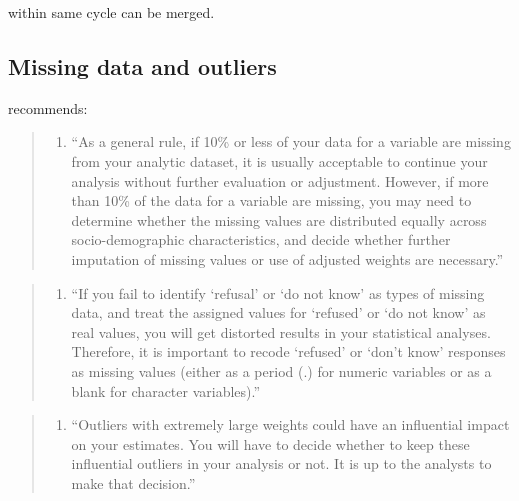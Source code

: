 \documentclass[
]{book}
\providecommand{\tightlist}{%
  \setlength{\itemsep}{0pt}\setlength{\parskip}{0pt}}
\begin{document}
within same cycle can be merged.

\hypertarget{missing-data-and-outliers}{%
\subsection{Missing data and outliers}\label{missing-data-and-outliers}}

\citet{CDCfaq} recommends:

\begin{quote}
\begin{enumerate}
\def\labelenumi{\arabic{enumi}.}
\tightlist
\item
  ``As a general rule, if 10\% or less of your data for a variable are missing from your analytic dataset, it is usually acceptable to continue your analysis without further evaluation or adjustment. However, if more than 10\% of the data for a variable are missing, you may need to determine whether the missing values are distributed equally across socio-demographic characteristics, and decide whether further imputation of missing values or use of adjusted weights are necessary.''
\end{enumerate}
\end{quote}

\begin{quote}
\begin{enumerate}
\def\labelenumi{\arabic{enumi}.}
\setcounter{enumi}{1}
\tightlist
\item
  ``If you fail to identify `refusal' or `do not know' as types of missing data, and treat the assigned values for `refused' or `do not know' as real values, you will get distorted results in your statistical analyses. Therefore, it is important to recode `refused' or `don't know' responses as missing values (either as a period (.) for numeric variables or as a blank for character variables).''
\end{enumerate}
\end{quote}

\begin{quote}
\begin{enumerate}
\def\labelenumi{\arabic{enumi}.}
\setcounter{enumi}{2}
\tightlist
\item
  ``Outliers with extremely large weights could have an influential impact on your estimates. You will have to decide whether to keep these influential outliers in your analysis or not. It is up to the analysts to make that decision.''
\end{enumerate}
\end{quote}
\end{document}
